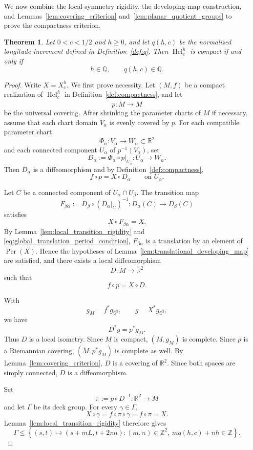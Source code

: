 \documentclass[a4paper,11pt]{amsart}
\numberwithin{equation}{section}
\theoremstyle{plain}
\newtheorem{thm}{Theorem}[section]
\begin{document}
We now combine the local-symmetry rigidity, the developing-map
construction, and Lemmas~\ref{lem:covering_criterion}
and~\ref{lem:planar_quotient_groups} to prove the compactness
criterion.

\begin{thm}
\label{thm:positive_c_compactness}
Let $0<c<1/2$ and $h\geq0$, and let $q(h,c)$ be the normalized
longitude increment defined in Definition~\ref{def:q}. Then
$\operatorname{Hel}_c^h$ is compact if and only if
\[
h\in\mathbb Q,
\qquad
q(h,c)\in\mathbb Q.
\]
\end{thm}

\begin{proof}
Write $X=X_c^h$. We first prove necessity. Let $(M,f)$ be a compact
realization of $\operatorname{Hel}_c^h$ in Definition~\ref{def:compactness}, and let
\[
p:\widetilde M\longrightarrow M
\]
be the universal covering. After shrinking the parameter charts of $M$
if necessary, assume that each chart domain $V_\alpha$ is evenly covered by $p$.
For each compatible parameter chart
\[
\Phi_\alpha:V_\alpha\longrightarrow W_\alpha\subset\mathbb R^2
\]
and each connected component $U_\alpha$ of $p^{-1}(V_\alpha)$, set
\[
D_\alpha
:=
\Phi_\alpha\circ p|_{U_\alpha}
:
U_\alpha\longrightarrow W_\alpha.
\]
Then $D_\alpha$ is a diffeomorphism and by Definition~\ref{def:compactness},
\[
f\circ p=X\circ D_\alpha
\qquad\text{on }U_\alpha.
\]

Let $C$ be a connected component of $U_\alpha\cap U_\beta$. The
transition map
\[
F_{\beta\alpha}
:=
D_\beta\circ(D_\alpha|_C)^{-1}
:
D_\alpha(C)\longrightarrow D_\beta(C)
\]
satisfies
\[
X\circ F_{\beta\alpha}=X.
\]
By Lemma~\ref{lem:local_transition_rigidity} and
\eqref{eq:global_translation_period_condition},
$F_{\beta\alpha}$ is a translation by an element of
$\operatorname{Per}(X)$. Hence the hypotheses of
Lemma~\ref{lem:translational_developing_map} are satisfied, and there
exists a local diffeomorphism
\[
D:\widetilde M\longrightarrow\mathbb R^2
\]
such that
\[
f\circ p=X\circ D.
\]

With
\[
g_M=f^*g_{\mathbb S^3},
\qquad
g=X^*g_{\mathbb S^3},
\]
we have
\[
D^*g=p^*g_M.
\]
Thus $D$ is a local isometry. Since $M$ is compact, $(M,g_M)$ is
complete. Since $p$ is a Riemannian covering,
$(\widetilde M,p^*g_M)$ is complete as well. By
Lemma~\ref{lem:covering_criterion}, $D$ is a covering of
$\mathbb R^2$. Since both spaces are simply connected, $D$ is a
diffeomorphism.

Set
\[
\pi:=p\circ D^{-1}:\mathbb R^2\longrightarrow M
\]
and let $\Gamma$ be its deck group. For every $\gamma\in\Gamma$,
\[
X\circ\gamma
=
f\circ\pi\circ\gamma
=
f\circ\pi
=
X.
\]
Lemma~\ref{lem:local_transition_rigidity} therefore gives
\[
\Gamma
\leq
\left\{
(s,t)\mapsto(s+mL,t+2\pi n):
(m,n)\in\mathbb Z^2,\ 
mq(h,c)+nh\in\mathbb Z
\right\}.
\]


\end{proof}
\end{document}
